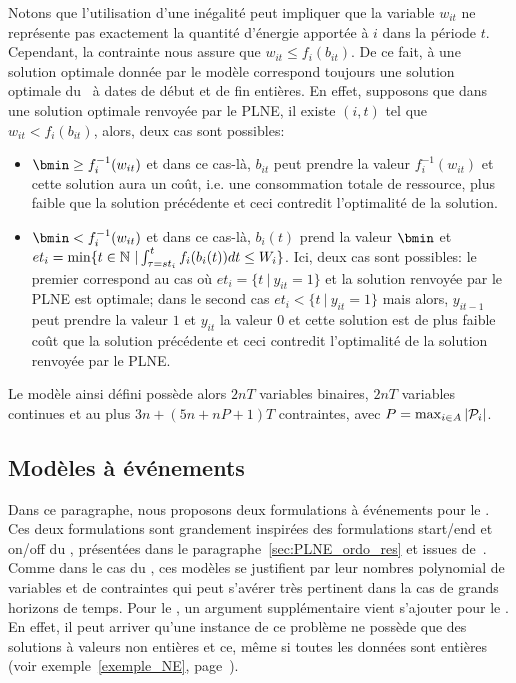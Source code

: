 Notons que l'utilisation d'une inégalité peut impliquer que la
variable $w_{it}$ ne représente pas exactement la quantité d'énergie
apportée à $i$ dans la période $t$. Cependant, la contrainte nous
assure que $w_{it} \le f_i(b_{it})$. De ce fait, à une solution
optimale donnée par le modèle correspond toujours une solution
optimale du \CECSP~à dates de début et de fin entières. En effet,
supposons que dans une solution optimale renvoyée par le PLNE, il
existe $(i,t)$ tel que $w_{it} < f_i(b_{it})$, alors, deux cas sont
possibles:
\begin{itemize}
\item $\bmin \ge f_i^{-1}(w_{it})$ et dans ce cas-là, $b_{it}$ peut
prendre la valeur $f_i^{-1}(w_{it})$ et cette solution aura un coût,
i.e. une consommation totale de ressource, plus faible que la solution
précédente et ceci contredit l'optimalité de la solution.
\item $\bmin < f_i^{-1}(w_{it})$ et dans ce cas-là, $b_i(t)$ prend la
valeur $\bmin$ et $et_i=\min \{t \in\mathbb{N}\ |\ \\
\int_{\tau=st_i}^{t} f_i(b_i(t))dt \le W_i\}$. Ici, deux cas sont
possibles: le premier correspond au cas où $et_i=\{t\ | \ y_{it}=1\}$
et la solution renvoyée par le PLNE est optimale; dans le second cas
$et_i<\{t\ |\ y_{it}=1\}$ mais alors, $y_{it-1}$ peut prendre la
valeur $1$ et $y_{it}$ la valeur $0$ et cette solution est de plus
faible coût que la solution précédente et ceci contredit l'optimalité
de la solution renvoyée par le PLNE.
\end{itemize}


Le modèle ainsi défini possède alors $2nT$ variables binaires, $2nT$
variables continues et au plus $3n + (5n +nP+1)T$ contraintes, avec
$P=\max_{i\in A}|\P_i|$.  

\subsection{Modèles à événements}

Dans ce paragraphe, nous proposons deux formulations à événements pour
le \CECSP. Ces deux formulations sont grandement inspirées des
formulations start/end et on/off du \RCPSP, présentées dans le
paragraphe~\ref{sec:PLNE_ordo_res} et issues
de~\cite{modele_RCPSP}. Comme dans le cas du \RCPSP, ces modèles se
justifient par leur nombres polynomial de variables et de contraintes
qui peut s'avérer très pertinent dans la cas de grands horizons de
temps. Pour le \CECSP, un argument supplémentaire vient s'ajouter pour
le \CECSP. En effet, il peut arriver qu'une instance de ce problème ne
possède que des solutions à valeurs non entières et ce, même si toutes
les données sont entières (voir exemple~\ref{exemple_NE},
page~\pageref{exemple_NE}).



